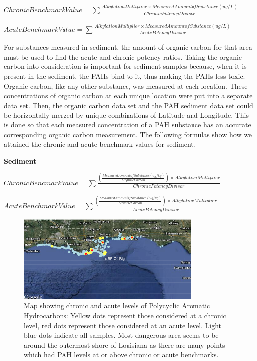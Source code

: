 \documentclass[authoryear,12pt]{elsarticle}
\begin{document}
$Chronic Benchmark Value = \sum \frac{Alkylation Multiplier \times Measured Amount of Substance (ug/L)}{Chronic Potency Divisor}$

$Acute Benchmark Value = \sum \frac{Alkylation Multiplier \times Measured Amount of Substance (ug/L)}{Acute Potency Divisor}$


For substances measured in sediment, the amount of organic carbon for that area must  be used to find the acute and chronic potency ratios. Taking the organic carbon into consideration is important for sediment samples because, when it is present in the sediment, the PAHs bind to it, thus making the PAHs less toxic. Organic carbon, like any other substance, was measured at each location. These concentrations of organic carbon at each unique location were put into a separate data set. Then, the organic carbon data set and the PAH sediment data set could be horizontally merged by unique combinations of Latitude and Longitude. This is done so that each measured concentration of a PAH substance has an accurate corresponding organic carbon measurement. The following formulas show how we attained the chronic and acute benchmark values for sediment.
\begin{center} \textbf{Sediment} \end{center}
$Chronic Bencmark Value = \sum \frac{(\frac{Measured Amount of Substance (ug/kg)}{Organic Carbon}) \times Alkylation Multiplier}{Chronic Potency Divisor}$

$Acute Benchmark Value = \sum \frac{(\frac{Measured Amount of Substance (ug/kg)}{Organic Carbon}) \times Alkylation Multiplier}{Acute Potency Divisor}$


\begin{figure}[htbp] %
   \centering
   \includegraphics[width=3.5in]{chron-acute-map.png} 
   \caption{Map showing chronic and acute levels of  Polycyclic Aromatic Hydrocarbons: Yellow dots represent those considered at a chronic level, red dots represent those considered at an acute level.  Light blue dots indicate all samples.  Most dangerous area seems to be around the outermost shore of Louisiana as there are many points which had PAH levels at or above chronic or acute benchmarks.}
   \label{pah-map}
\end{figure}
\end{document}
